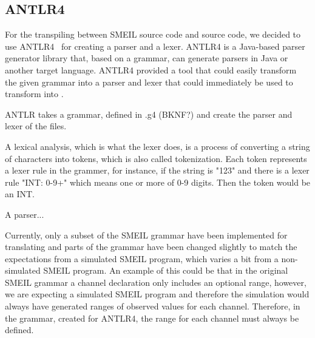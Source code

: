%
%





\subsection{ANTLR4}
For the transpiling between SMEIL source code and \cspm{} source code, we decided to use ANTLR4~\cite{antlr} for creating a parser and a lexer. ANTLR4 is a Java-based parser generator library that, based on a grammar, can generate parsers in Java or another target language. ANTLR4 provided a tool that could easily transform the given grammar into a parser and lexer that could immediately be used to transform into \cspm{}.

ANTLR takes a grammar, defined in .g4 (BKNF?) and create the parser and lexer of the files.

A lexical analysis, which is what the lexer does, is a process of converting a string of characters into tokens, which is also called tokenization. Each token represents a lexer rule in the grammer, for instance, if the string is "123" and there is a lexer rule "INT: {0-9}+" which means one or more of 0-9 digits. Then the token would be an INT.

A parser...%

Currently, only a subset of the SMEIL grammar have been implemented for translating and parts of the grammar have been changed slightly to match the expectations from a simulated SMEIL program, which varies a bit from a non-simulated SMEIL program. An example of this could be that in the original SMEIL grammar a channel declaration only includes an optional range, however, we are expecting a simulated SMEIL program and therefore the simulation would always have generated ranges of observed values for each channel. Therefore, in the grammar, created for ANTLR4, the range for each channel must always be defined.


